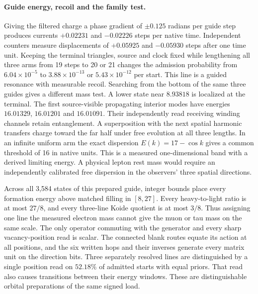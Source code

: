 \paragraph{Guide energy, recoil and the family test.}
Giving the filtered charge a phase gradient of $\pm0.125$ radians per
guide step produces currents $+0.02231$ and $-0.02226$ steps per native
time. Independent counters measure displacements of $+0.05925$ and
$-0.05930$ steps after one time unit. Keeping the terminal triangles,
source and clock fixed while lengthening all three arms from 19 steps to
20 or 21 changes the admission probability from $6.04\times10^{-5}$ to
$3.88\times10^{-13}$ or $5.43\times10^{-12}$ per start. This line is a
guided resonance with measurable recoil.
Searching from the bottom of the same three guides gives a different
mass test. A lower state near $8.93818$ is localized at the terminal.
The first source-visible propagating interior modes have energies
$16.01329$, $16.01201$ and $16.01091$. Their independently read
receiving winding channels retain entanglement. A superposition with
the next spatial harmonic transfers charge toward the far half under
free evolution at all three lengths. In an infinite uniform arm the
exact dispersion $E(k)=17-\cos k$ gives a common threshold of
16 in native units. This is a measured one-dimensional band with a
derived limiting energy. A physical lepton rest mass would require
an independently calibrated free dispersion in the observers' three
spatial directions.

Across all 3,584 states of this prepared guide, integer bounds place every
formation energy above matched filling in $[8,27]$. Every heavy-to-light
ratio is at most $27/8$, and every three-line Koide quotient is at most
$3/8$. Thus assigning one line the measured electron mass cannot give the
muon or tau mass on the same scale. The only operator commuting with the
generator and every sharp vacancy-position read is scalar. The connected
blank routes equate its action at all positions, and the six written hops
and their inverses generate every matrix unit on the direction bits.
Three separately resolved lines are distinguished by a single position
read on $52.18\%$ of admitted starts with equal priors. That read also
causes transitions between their energy windows. These are distinguishable
orbital preparations of the same signed load.

